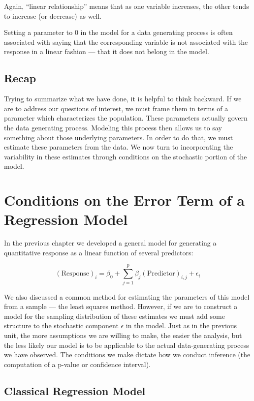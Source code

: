 \documentclass[]{book}
\theoremstyle{definition}
\theoremstyle{definition}
\theoremstyle{definition}
\theoremstyle{remark}
\let\BeginKnitrBlock\begin \let\EndKnitrBlock\end
\begin{document}
Again, ``linear relationship'' means that as one variable increases, the
other tends to increase (or decrease) as well.

\BeginKnitrBlock{rmdkeyidea}
Setting a parameter to 0 in the model for a data generating process is
often associated with saying that the corresponding variable is not
associated with the response in a linear fashion --- that it does not
belong in the model.
\EndKnitrBlock{rmdkeyidea}

\section{Recap}\label{recap-2}

Trying to summarize what we have done, it is helpful to think backward.
If we are to address our questions of interest, we must frame them in
terms of a parameter which characterizes the population. These
parameters actually govern the data generating process. Modeling this
process then allows us to say something about those underlying
parameters. In order to do that, we must estimate these parameters from
the data. We now turn to incorporating the variability in these
estimates through conditions on the stochastic portion of the model.

\chapter{Conditions on the Error Term of a Regression
Model}\label{Regconditions}

In the previous chapter we developed a general model for generating a
quantitative response as a linear function of several predictors:

\[(\text{Response})_i = \beta_0 + \sum_{j=1}^{p} \beta_j (\text{Predictor})_{i,j} + \epsilon_i\]

We also discussed a common method for estimating the parameters of this
model from a sample --- the least squares method. However, if we are to
construct a model for the sampling distribution of these estimates we
must add some structure to the stochastic component \(\epsilon\) in the
model. Just as in the previous unit, the more assumptions we are willing
to make, the easier the analysis, but the less likely our model is to be
applicable to the actual data-generating process we have observed. The
conditions we make dictate how we conduct inference (the computation of
a p-value or confidence interval).

\section{Classical Regression Model}\label{classical-regression-model}
\end{document}
